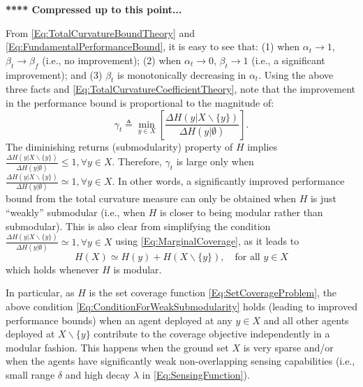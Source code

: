 \documentclass[letterpaper, 10 pt, conference]{ieeeconf}
\begin{document}
\bigskip
{\color{blue} \textbf{**** Compressed up to this point...} }
\bigskip

From \eqref{Eq:TotalCurvatureBoundTheory} and \eqref{Eq:FundamentalPerformanceBound}, it is easy to see that: (1) when $\alpha_t\rightarrow 1$, $\beta_t\rightarrow\beta_f$ (i.e., no improvement); (2) when $\alpha_t\rightarrow 0$, $\beta_t\rightarrow 1$ (i.e., a significant improvement); and  (3) $\beta_t$ is monotonically decreasing in $\alpha_t$. Using the above three facts and \eqref{Eq:TotalCurvatureCoefficientTheory}, note that the improvement in the performance bound is proportional to the magnitude of:
\begin{equation}\label{Eq:TotolCurvatureGamma}
    \gamma_t \triangleq \min_{y \in X}\left[\frac{\Delta H(y \vert X \backslash \{y\})}{\Delta H(y \vert \emptyset)}\right].
\end{equation}
The diminishing returns (submodularity) property of $H$ implies $\frac{\Delta H(y \vert X \backslash \{y\})}{\Delta H(y \vert \emptyset)} \leq 1, \forall y\in X$. Therefore, $\gamma_t$ is large only when $\frac{\Delta H(y \vert X \backslash \{y\})}{\Delta H(y \vert \emptyset)} \simeq 1, \forall y\in X$. In other words, a significantly improved performance bound from the total curvature measure can only be obtained when $H$ is just ``weakly'' submodular (i.e., when $H$ is closer to being modular rather than submodular). This is also clear from simplifying the condition $\frac{\Delta H(y \vert X \backslash \{y\})}{\Delta H(y \vert \emptyset)} \simeq 1, \forall y \in X$ using \eqref{Eq:MarginalCoverage}, as it leads to
\begin{equation}
\label{Eq:ConditionForWeakSubmodularity}
     H(X) \simeq H(y) + H(X\backslash \{y\}), \quad \mbox{for all } y\in X
\end{equation}
which holds whenever $H$ is modular. 

In particular, as $H$ is the set coverage function \eqref{Eq:SetCoverageProblem}, the above condition \eqref{Eq:ConditionForWeakSubmodularity} holds (leading to improved performance bounds) when an agent deployed at any $y\in X$ and all other agents deployed at $X \backslash \{y\}$ contribute to the coverage objective independently in a modular fashion. This happens when the ground set $X$ is very sparse and/or when the agents have significantly weak non-overlapping sensing capabilities (i.e., small range $\delta$ and high decay $\lambda$ in \eqref{Eq:SensingFunction}). 
\end{document}
